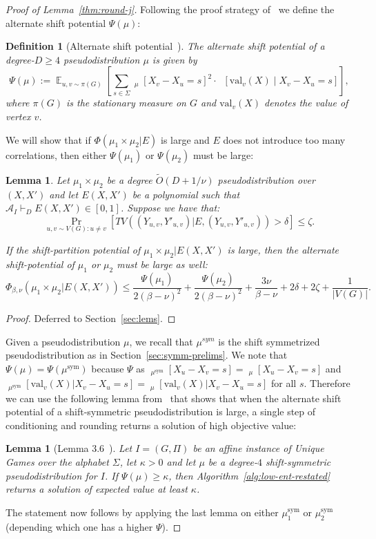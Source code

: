 \documentclass[11pt]{article}
\DeclareMathOperator*{\E}{\mathbb{E}}
\DeclareMathOperator*{\pE}{\widetilde{\mathbb{E}}}
\DeclareMathOperator*{\pPr}{\widetilde{\Pr}}
\def \cA {\mathcal{A}}
\def \sym {\text{sym}}
\def \val {\mathrm{val}}
\newtheorem{lemma}[theorem]{Lemma}
\newtheorem{definition}[theorem]{Definition}
\theoremstyle{definition}
\begin{document}
 
\begin{proof}[Proof of Lemma~\ref{thm:round-j}]
Following the proof strategy of~\cite{BBKSS} we define the alternate shift potential $\Psi(\mu)$:
\begin{definition}[Alternate shift potential~\cite{BBKSS}]
The {\em alternate shift potential} of a degree-$D \ge 4$ pseudodistribution $\mu$ is given by
\[
\Psi(\mu) := \E_{u,v \sim \pi(G)} \left[\sum_{s \in \Sigma} \pPr_\mu[X_v - X_u = s]^2 \cdot \pE[\val_v(X) \mid X_v - X_u = s] \right],
\]
where $\pi(G)$ is the stationary measure on $G$ and $\val_v(X)$ denotes the value of vertex $v$.
\end{definition}

We will show that if $\Phi(\mu_1 \times \mu_2 | E)$ is large and $E$ does not introduce too many correlations, then either $\Psi(\mu_1)$ or $\Psi(\mu_2)$ must be large:
\begin{lemma}\label{lem:relating-ent-j}
Let $\mu_1 \times \mu_2$ be a degree $\widetilde{O}(D+1/\nu)$ pseudodistribution over $(X,X')$ and let $E(X,X')$ be a polynomial such that $\cA_I \vdash_D E(X,X') \in [0,1]$. Suppose we have that: 
\[\Pr_{u,v \sim V(G): u \neq v}[TV((Y_{u,v},Y'_{u,v})|E , (Y_{u,v},Y'_{u,v})) > \delta] \leq \zeta.\]

If the shift-partition potential of $\mu_1 \times \mu_2 |E(X,X')$ is large, then the alternate shift-potential of $\mu_1$ or $\mu_2$ must be large as well:
\[\Phi_{\beta,\nu}(\mu_1 \times \mu_2 | E(X,X')) \leq \frac{\Psi(\mu_1)}{2(\beta-\nu)^2} +\frac{\Psi(\mu_2)}{2(\beta-\nu)^2} + \frac{3\nu}{\beta - \nu} + 2\delta + 2\zeta + \frac{1}{|V(G)|}.\]
\end{lemma}
\begin{proof}
Deferred to Section~\ref{sec:lems}.
\end{proof}
Given a pseudodistribution $\mu$, we 
recall that $\mu^{sym}$ is the shift symmetrized pseudodistribution as in Section~\ref{sec:symm-prelims}.
We note that $\Psi(\mu) = \Psi(\mu^{\sym})$ because $\Psi$ as $\pPr_{\mu^\sym}[X_u - X_v = s] = \pPr_{\mu}[X_u - X_v = s]$ and $\pE_{\mu^\sym}[\val_v(X)|X_v - X_u = s] = \pE_{\mu}[\val_v(X)|X_v - X_u = s]$ for all $s$.  Therefore we can use the following lemma from~\cite{BBKSS} that shows that when the alternate shift potential of a shift-symmetric pseudodistribution is large, a single step of conditioning and rounding returns a solution of high objective value:
\begin{lemma}[Lemma 3.6~\cite{BBKSS}]
Let $I = (G, \Pi)$ be an affine instance of Unique Games over the alphabet $\Sigma$, let $\kappa>0$ and 
let $\mu$ be a degree-$4$ shift-symmetric pseudodistribution for $I$. If $\Psi(\mu) \geq \kappa$, then Algorithm~\ref{alg:low-ent-restated} returns a solution of expected value at least $\kappa$.
\end{lemma}

The statement now follows by applying the last lemma on either $\mu^\sym_1$ or $\mu^\sym_2$ (depending 
which one has a higher $\Psi$).
\end{proof}
\end{document}
